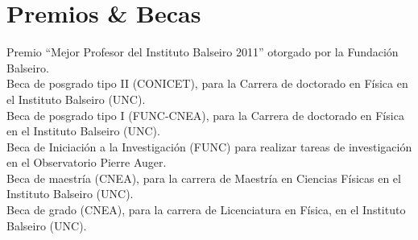 \section*{Premios \& Becas}
\noindent
{}Premio ``Mejor Profesor del Instituto Balseiro 2011'' otorgado por la Fundación Balseiro.\\
Beca de posgrado tipo II (CONICET), para la Carrera de doctorado en Física en el Instituto Balseiro (UNC).\\
Beca de posgrado tipo I (FUNC-CNEA), para la Carrera de doctorado en Física en el Instituto Balseiro (UNC).\\
Beca de Iniciación a la Investigación (FUNC) para realizar tareas de investigación en el Observatorio Pierre Auger.\\
Beca de maestría (CNEA), para la carrera de Maestría en Ciencias Físicas en el Instituto Balseiro (UNC).\\
Beca de grado (CNEA), para la carrera de Licenciatura en Física, en el Instituto Balseiro (UNC).
\fi
